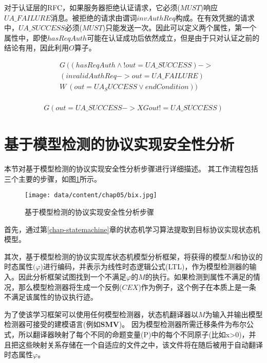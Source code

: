 对于认证层的RFC，如果服务器拒绝认证请求，它必须($MUST$)响应$UA\_FAILURE$消息。被拒绝的请求由谓词$invAuthReq$构成。在有效凭据的请求中，$UA\_SUCCESS$必须($MUST$)只能发送一次。因此可以定义两个属性，第一个属性中，即使$hasReqAuth$可能在认证成功后依然成立，但是由于只对认证之前的结论有用，因此利用$O$算子。
\begin{PROPERTY}
\[
\begin{aligned}
&G\ ( (hasReqAuth \wedge ! out = UA\_SUCCESS) ->\\
&(invalidAuthReq -> out = UA\_FAILURE)\\
&W\ (out = UA_SUCCESS \vee endCondition))\\
\end{aligned}
\]
\end{PROPERTY}


\begin{PROPERTY}
\[
\begin{aligned}
G( out = UA\_SUCCESS ->　X G out!= UA\_SUCCESS)
\end{aligned}
\]
\end{PROPERTY}
\section{基于模型检测的协议实现安全性分析}
本节对基于模型检测的协议实现安全性分析步骤进行详细描述。
其工作流程包括三个主要的步骤，如图\ref{fig:CHIRONworkflow}所示。
\begin{figure}[htb]
  \centering%
  \texttt{[image: data/content/chap05/bix.jpg]}
  \caption{基于模型检测的协议实现安全性分析步骤}
  \label{fig:CHIRONworkflow}
\end{figure}

首先，通过第\ref{chap-statemachine}章的状态机学习算法提取到目标协议实现状态机模型。

其次，基于模型检测的协议实现库状态机模型分析框架，将获得的模型$M$和协议的时态属性$(\varphi$)进行编码，并表示为线性时态逻辑公式(LTL)，作为模型检测器的输入。因此分析框架试图找到一个不满足$\varphi$的$M$的执行。如果检测到属性不满足的情况，那么模型检测器将生成一个反例($CEX$)作为例子，这个例子在本质上是一条不满足该属性的协议执行迹。

为了使该学习框架可以使用任何模型检测器，状态机翻译器以$M$为输入并输出模型检测器可接受的建模语言(例如$\mathbf{SMV}$)。
因为模型检测器所需迁移条件为布尔公式，所以翻译器映射了每个不同的命题变量(P)中的每个不同原子(比如x>0)，并且把这些映射关系存储在一个自适应的文件之中，该文件将在随后被用于自动翻译时态属性$\varphi$。%

